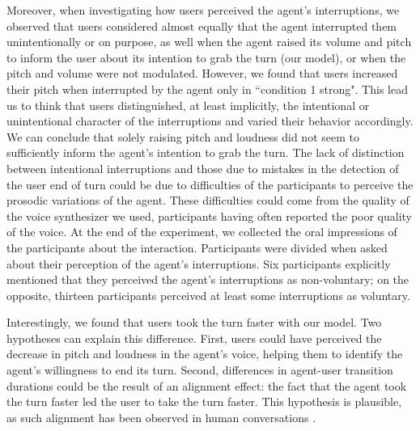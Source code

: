 Moreover, when investigating how users perceived the agent's interruptions, we observed that users considered almost equally that the agent interrupted them unintentionally or on purpose, as well when the agent raised its volume and pitch to inform the user about its intention to grab the turn (our model), or when the pitch and volume were not modulated. However, we found that users increased their pitch when interrupted by the agent only in ``condition 1 strong". This lead us to think that users distinguished, at least implicitly, the intentional or unintentional character of the interruptions and varied their behavior accordingly. We can conclude that solely raising pitch and loudness did not seem to sufficiently inform the agent's intention to grab the turn. The lack of distinction between intentional interruptions and those due to mistakes in the detection of the user end of turn could be due to difficulties of the participants to perceive the prosodic variations of the agent. These difficulties could come from the quality of the voice synthesizer we used, participants having often reported the poor quality of the voice. 
At the end of the experiment, we collected the oral impressions of the participants about the interaction. Participants were divided when asked about their perception of the agent's interruptions. Six participants explicitly mentioned that they perceived the agent's interruptions as non-voluntary; on the opposite, thirteen participants perceived at least some interruptions as voluntary. 

 Interestingly, we found that users took the turn faster with our model. Two hypotheses can explain this difference. 
First, users could have perceived the decrease in pitch and loudness in the agent's voice, helping them to identify the agent's willingness to end its turn. 
Second, differences in agent-user transition durations could be the result of an alignment effect: the fact that the agent took the turn faster led the user to take the turn faster. This hypothesis is plausible, as such alignment has been observed in human conversations \citep{levitan_entrainment_2015}.  

